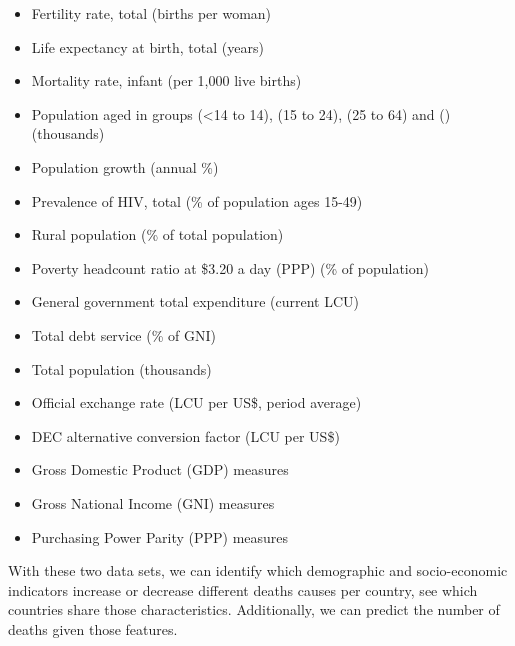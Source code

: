 \begin{itemize}
    \item Fertility rate, total (births per woman)
    \item Life expectancy at birth, total (years)
    \item Mortality rate, infant (per 1,000 live births)
    \item Population aged in groups (<14 to 14), (15 to 24), (25 to 64) and () (thousands)
    \item Population growth (annual \%)
    \item Prevalence of HIV, total (\% of population ages 15-49)
    \item Rural population (\% of total population)
    \item Poverty headcount ratio at \$3.20 a day (PPP) (\% of population)
    \item General government total expenditure (current LCU)
    \item Total debt service (\% of GNI)
    \item Total population (thousands)
    \item Official exchange rate (LCU per US\$, period average)
    \item DEC alternative conversion factor (LCU per US\$)
    \item Gross Domestic Product (GDP) measures
    \item Gross National Income (GNI) measures
    \item Purchasing Power Parity (PPP) measures
\end{itemize}

With these two data sets, we can identify which demographic and socio-economic indicators increase or decrease different deaths causes per country, see which countries share those characteristics. Additionally, we can predict the number of deaths given those features.